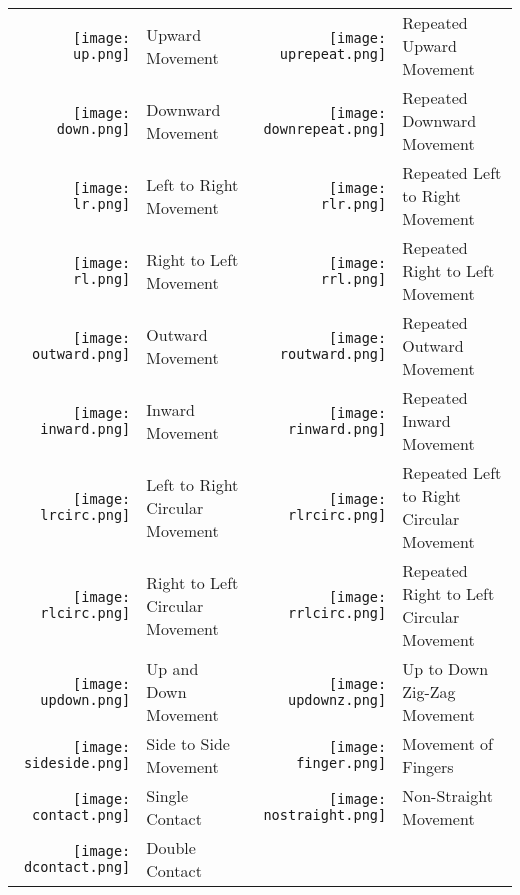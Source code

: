 \documentclass{tufte-book}
\begin{document}
\begin{tabular}{r l r l}
\texttt{[image: up.png]} & Upward Movement & \texttt{[image: uprepeat.png]} & Repeated Upward Movement\\
\texttt{[image: down.png]} & Downward Movement & \texttt{[image: downrepeat.png]} & Repeated Downward Movement\\

\texttt{[image: lr.png]} & Left to Right Movement & \texttt{[image: rlr.png]} & Repeated Left to Right Movement\\

\texttt{[image: rl.png]} & Right to Left Movement & \texttt{[image: rrl.png]} & Repeated Right to Left Movement\\

\texttt{[image: outward.png]} & Outward Movement & \texttt{[image: routward.png]} & Repeated Outward Movement\\

\texttt{[image: inward.png]} & Inward Movement & \texttt{[image: rinward.png]} & Repeated Inward Movement\\

\texttt{[image: lrcirc.png]} & Left to Right Circular Movement & \texttt{[image: rlrcirc.png]} & Repeated Left to Right Circular Movement\\

\texttt{[image: rlcirc.png]} & Right to Left Circular Movement & \texttt{[image: rrlcirc.png]} & Repeated Right to Left Circular Movement\\

\texttt{[image: updown.png]} & Up and Down Movement & \texttt{[image: updownz.png]} & Up to Down Zig-Zag Movement\\

\texttt{[image: sideside.png]} & Side to Side Movement & \texttt{[image: finger.png]} & Movement of Fingers\\

\texttt{[image: contact.png]} & Single Contact & \texttt{[image: nostraight.png]} & Non-Straight Movement\\

\texttt{[image: dcontact.png]} & Double Contact & \\

\end{tabular}
\end{document}

